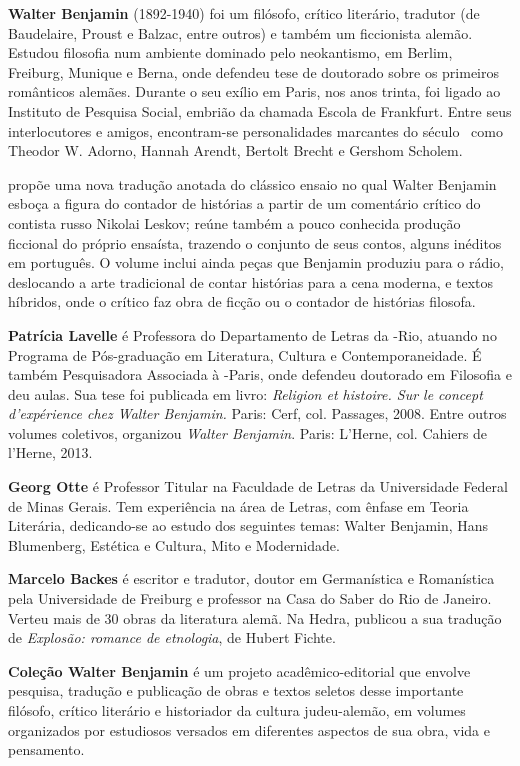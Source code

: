 
\textbf{Walter Benjamin} (1892-1940) foi um filósofo, crítico literário, tradutor (de Baudelaire, Proust e Balzac, entre outros) e também um ficcionista alemão. Estudou filosofia num ambiente dominado pelo neokantismo, em Berlim, Freiburg, Munique e Berna, onde defendeu tese de doutorado sobre os primeiros românticos alemães. Durante o seu exílio em Paris, nos anos trinta, foi ligado ao Instituto de Pesquisa Social, embrião da chamada Escola de Frankfurt. Entre seus interlocutores e amigos, encontram-se personalidades marcantes do século~ como Theodor W. Adorno, Hannah Arendt, Bertolt Brecht e Gershom Scholem.

\textbf{\titulo} propõe uma nova tradução anotada do clássico ensaio no qual Walter Benjamin esboça a figura do contador de histórias a partir de um comentário crítico do contista russo Nikolai Leskov; reúne também a pouco conhecida produção ficcional do próprio ensaísta, trazendo o conjunto de seus contos, alguns inéditos em português. O volume inclui ainda peças que Benjamin produziu para o rádio, deslocando a arte tradicional de contar histórias para a cena moderna, e textos híbridos, onde o crítico faz obra de ficção ou o contador de histórias filosofa.

\textbf{Patrícia Lavelle} é Professora do Departamento de Letras da -Rio, atuando no Programa de Pós-graduação em Literatura, Cultura e Contemporaneidade. É também Pesquisadora Associada à -Paris, onde defendeu doutorado em Filosofia e deu aulas. Sua tese foi publicada em livro: \emph{Religion et histoire. Sur le concept d’expérience chez Walter Benjamin.} Paris: Cerf, col. Passages, 2008. Entre outros volumes coletivos, organizou \emph{Walter Benjamin}. Paris: L’Herne, col. Cahiers de l’Herne, 2013. 

\textbf{Georg Otte} é Professor Titular na Faculdade de Letras da Universidade Federal de Minas Gerais. Tem experiência na área de Letras, com ênfase em Teoria Literária, dedicando-se ao estudo dos seguintes temas: Walter Benjamin, Hans Blumenberg, Estética e Cultura, Mito e Modernidade.

\textbf{Marcelo Backes} é escritor e tradutor, doutor em Germanística e Romanística pela Universidade de Freiburg e professor na Casa do Saber do Rio de Janeiro. Verteu mais de 30 obras da literatura alemã. Na Hedra, publicou a sua tradução de \emph{Explosão: romance de etnologia}, de Hubert Fichte.

\textbf{Coleção Walter Benjamin} é um projeto acadêmico-editorial que envolve pesquisa, tradução e publicação de obras e textos seletos desse importante filósofo, crítico literário e historiador da cultura judeu-alemão, em volumes organizados por estudiosos versados em diferentes aspectos de sua obra, vida e pensamento. 

